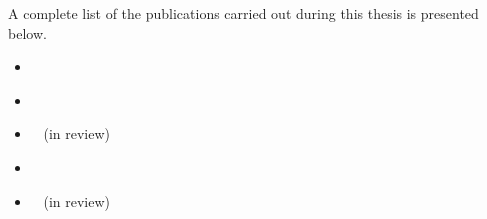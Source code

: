 A complete list of the publications carried out during this thesis is presented below.
\begin{itemize}
  \item\cite{fm16}~
  \item\cite{apsec17}~
  \item\cite{lites}~ (in review)
  \item\cite{drift}~ 
  \item\cite{sbip}~ (in review)
\end{itemize}


